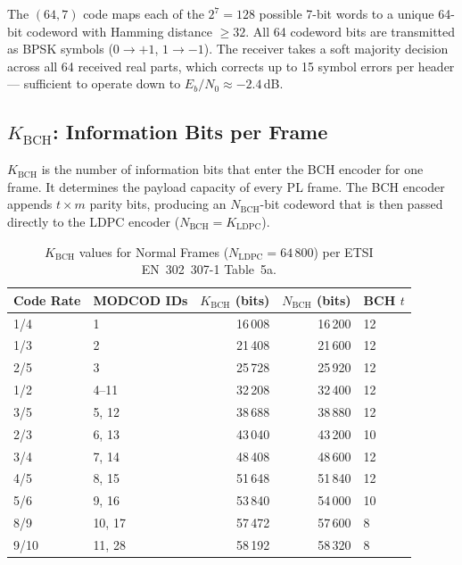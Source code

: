 \documentclass[12pt,a4paper]{report}
\begin{document}
\noindent
The $(64,7)$ code maps each of the $2^7=128$ possible 7-bit words to a unique
64-bit codeword with Hamming distance $\geq32$.  All 64 codeword bits are
transmitted as BPSK symbols ($0\to+1$, $1\to-1$).  The receiver takes a
soft majority decision across all 64 received real parts, which corrects up to
15 symbol errors per header --- sufficient to operate down to $E_b/N_0 \approx
-2.4$\,dB.

\subsection{\texorpdfstring{$K_\text{BCH}$}{K\_BCH}: Information Bits per Frame}
\label{sec:kbch}

\textbf{$K_\text{BCH}$} is the number of information bits that enter the BCH
encoder for one frame.  It determines the payload capacity of every PL frame.
The BCH encoder appends $t \times m$ parity bits, producing an
$N_\text{BCH}$-bit codeword that is then passed directly to the LDPC encoder
($N_\text{BCH} = K_\text{LDPC}$).

\begin{table}[H]
\centering
\caption{$K_\text{BCH}$ values for Normal Frames ($N_\text{LDPC}=64\,800$) per
ETSI EN~302~307-1 Table~5a.}
\label{tab:kbch}
\begin{tabular}{llrrl}
\toprule
Code Rate & MODCOD IDs & $K_\text{BCH}$ (bits) & $N_\text{BCH}$ (bits) & BCH $t$ \\
\midrule
1/4  & 1        & 16\,008 & 16\,200 & 12 \\
1/3  & 2        & 21\,408 & 21\,600 & 12 \\
2/5  & 3        & 25\,728 & 25\,920 & 12 \\
1/2  & 4--11    & 32\,208 & 32\,400 & 12 \\
3/5  & 5, 12    & 38\,688 & 38\,880 & 12 \\
2/3  & 6, 13    & 43\,040 & 43\,200 & 10 \\
3/4  & 7, 14    & 48\,408 & 48\,600 & 12 \\
4/5  & 8, 15    & 51\,648 & 51\,840 & 12 \\
5/6  & 9, 16    & 53\,840 & 54\,000 & 10 \\
8/9  & 10, 17   & 57\,472 & 57\,600 &  8 \\
9/10 & 11, 28   & 58\,192 & 58\,320 &  8 \\
\bottomrule
\end{tabular}
\end{table}
\end{document}
